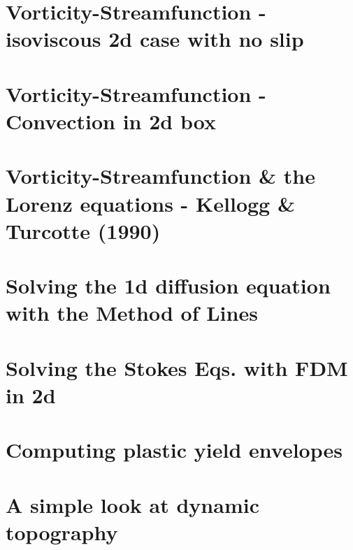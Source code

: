 \documentclass[a4paper,11pt]{report}
\begin{document}
\chapter{Vorticity-Streamfunction - isoviscous 2d case with no slip\label{f154}} %

\chapter{Vorticity-Streamfunction - Convection in 2d box \label{f155}} %

\chapter{Vorticity-Streamfunction \& the Lorenz equations - Kellogg \& Turcotte (1990)  \label{f156}} %

\chapter{Solving the 1d diffusion equation with the Method of Lines  \label{f157}} %

\chapter{Solving the Stokes Eqs. with FDM in 2d \label{f158}} %

\chapter{Computing plastic yield envelopes \label{f159}} %

\chapter{A simple look at dynamic topography \label{f160}} %
\end{document}
